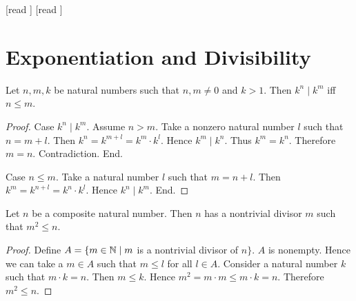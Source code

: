 \documentclass[10pt]{article}
\begin{document}
  \begin{imports}
    \begin{forthel}
      [read ]
      [read ]
    \end{forthel}
  \end{imports}


  \section*{Exponentiation and Divisibility}

  \begin{forthel}
    \begin{proposition}[id=ARITHMETIC_13_8426075493236736,printid]
      Let $n, m, k$ be natural numbers such that $n, m \neq 0$ and $k > 1$.
      Then $k^{n} \mid k^{m}$ iff $n \leq m$.
    \end{proposition}
    \begin{proof}
      Case $k^{n} \mid k^{m}$.
        Assume $n > m$.
        Take a nonzero natural number $l$ such that $n = m + l$.
        Then $k^{n}
          = k^{m + l}
          = k^{m} \cdot k^{l}$.
        Hence $k^{m} \mid k^{n}$.
        Thus $k^{m} = k^{n}$.
        Therefore $m = n$.
        Contradiction.
      End.
  
      Case $n \leq m$.
        Take a natural number $l$ such that $m = n + l$.
        Then $k^{m}
          = k^{n + l}
          = k^{n} \cdot k^{l}$.
        Hence $k^{n} \mid k^{m}$.
      End.
    \end{proof}
  \end{forthel}
  
  \begin{forthel}
    \begin{proposition}[id=ARITHMETIC_13_797196163219456,printid]
      Let $n$ be a composite natural number.
      Then $n$ has a nontrivial divisor $m$ such that $m^{2} \leq n$.
    \end{proposition}
    \begin{proof}
      Define $A = \{ m \in \mathbb{N} \mid m$ is a nontrivial divisor of $n \}$.
      $A$ is nonempty.
      Hence we can take a $m \in A$ such that $m \leq l$ for all $l \in A$.
      Consider a natural number $k$ such that $m \cdot k = n$.
      Then $m \leq k$.
      Hence $m^{2} = m \cdot m \leq m \cdot k = n$.
      Therefore $m^{2} \leq n$.
    \end{proof}
  \end{forthel}
\end{document}
